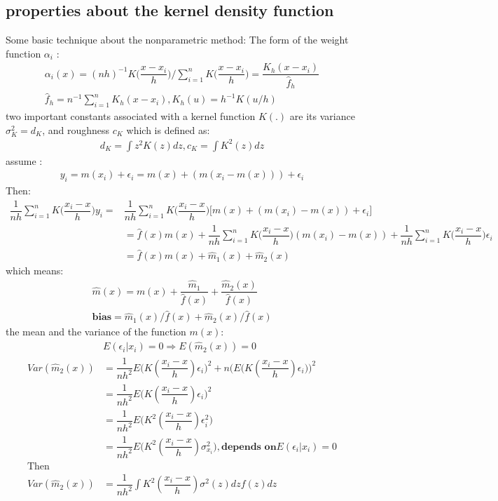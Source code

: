 \documentclass[12pt]{amsart}
\begin{document}
\subsection{properties about the kernel density function}
Some basic technique about the nonparametric method:
The form of the weight function $\alpha_{i}$ :
\begin{align}
\alpha_{i}(x)=(nh)^{-1}K\bigg(\dfrac{x-x_{i}}{h}\bigg)\bigg/\sum_{i=1}^{n}K\bigg(\dfrac{x-x_{i}}{h}\bigg)=\dfrac{K_{h}(x-x_{i})}{\hat{f}_{h}}\nonumber\\
\hat{f}_{h}=n^{-1}\sum_{i=1}^{n}K_{h}(x-x_{i}),K_{h}(u)=h^{-1}K(u/h)\nonumber
\end{align}
two important constants associated with a kernel function $K(.)$ are its variance $\sigma^{2}_{K}=d_{K}$, and roughness $c_{K}$ which is defined as:
\begin{align}
d_{K}=\int z^{2}K(z)dz, c_{K}=\int K^{2}(z)dz \nonumber
\end{align}
assume :
\begin{align}
y_{i}=m(x_{i})+\epsilon_{i}=m(x)+(m(x_{i}-m(x)))+\epsilon_{i}\nonumber
\end{align}
Then:
\begin{align}
\dfrac{1}{nh}\sum_{i=1}^{n}K\bigg(\dfrac{x_{i}-x}{h}\bigg)y_{i}=&\dfrac{1}{nh}\sum_{i=1}^{n}K\bigg(\dfrac{x_{i}-x}{h}\bigg)\bigg[m(x)+(m(x_{i})-m(x))+\epsilon_{i}\bigg]\nonumber\\
&=\hat{f}(x)m(x)+\dfrac{1}{nh}\sum_{i=1}^{n}K\bigg(\dfrac{x_{i}-x}{h}\bigg)(m(x_{i})-m(x))+\dfrac{1}{nh}\sum_{i=1}^{n}K\bigg(\dfrac{x_{i}-x}{h}\bigg)\epsilon_{i}\nonumber\\
&=\hat{f}(x)m(x)+\hat{m}_{1}(x)+\hat{m}_{2}(x)
\end{align}
which means:
\begin{align}
\hat{m}(x)=m(x)+\dfrac{\hat{m}_{1}}{\hat{f}(x)}+\dfrac{\hat{m}_{2}(x)}{\hat{f}(x)}\nonumber\\
\textbf{bias}=\hat{m}_{1}(x)/\hat{f}(x)+\hat{m}_{2}(x)/\hat{f}(x)
\end{align}
the mean and the variance of the function $m(x)$:
\begin{align}
&E(\epsilon_{i}|x_{i})=0\Rightarrow E(\hat{m}_{2}(x))=0\nonumber\\
Var(\hat{m}_{2}(x))&=\dfrac{1}{nh^{2}}E\bigg(K(\dfrac{x_{i}-x}{h})\epsilon_{i}\bigg)^{2}+n\bigg(E\bigg(K(\dfrac{x_{i}-x}{h})\epsilon_{i}\bigg)\bigg)^{2}\nonumber\\
&=\dfrac{1}{nh^{2}}E\bigg(K(\dfrac{x_{i}-x}{h})\epsilon_{i}\bigg)^{2}\nonumber\\
&=\dfrac{1}{nh^{2}}E\bigg(K^{2}(\dfrac{x_{i}-x}{h})\epsilon^{2}_{i}\bigg)\nonumber\\
&=\dfrac{1}{nh^{2}}E\bigg(K^{2}(\dfrac{x_{i}-x}{h})\sigma^{2}_{x_{i}}\bigg), \textbf{depends on}  E(\epsilon_{i}|x_{i})=0\\
\text{Then}&\nonumber\\
Var(\hat{m}_{2}(x))&=\dfrac{1}{nh^{2}}\int K^{2}(\dfrac{x_{i}-x}{h})\sigma^{2}(z)dzf(z)dz
\end{align}
\end{document}
